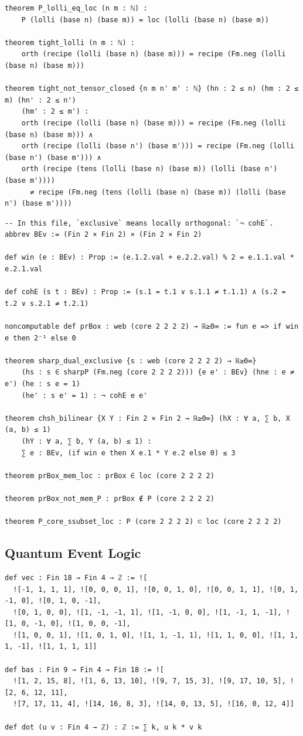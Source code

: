 \begin{lstlisting}
theorem P_lolli_eq_loc (n m : ℕ) :
    P (lolli (base n) (base m)) = loc (lolli (base n) (base m))

theorem tight_lolli (n m : ℕ) :
    orth (recipe (lolli (base n) (base m))) = recipe (Fm.neg (lolli (base n) (base m)))

theorem tight_not_tensor_closed {n m n' m' : ℕ} (hn : 2 ≤ n) (hm : 2 ≤ m) (hn' : 2 ≤ n')
    (hm' : 2 ≤ m') :
    orth (recipe (lolli (base n) (base m))) = recipe (Fm.neg (lolli (base n) (base m))) ∧
    orth (recipe (lolli (base n') (base m'))) = recipe (Fm.neg (lolli (base n') (base m'))) ∧
    orth (recipe (tens (lolli (base n) (base m)) (lolli (base n') (base m'))))
      ≠ recipe (Fm.neg (tens (lolli (base n) (base m)) (lolli (base n') (base m'))))
\end{lstlisting}

\begin{lstlisting}
-- In this file, `exclusive` means locally orthogonal: `¬ cohE`.
abbrev BEv := (Fin 2 × Fin 2) × (Fin 2 × Fin 2)

def win (e : BEv) : Prop := (e.1.2.val + e.2.2.val) % 2 = e.1.1.val * e.2.1.val

def cohE (s t : BEv) : Prop := (s.1 = t.1 ∨ s.1.1 ≠ t.1.1) ∧ (s.2 = t.2 ∨ s.2.1 ≠ t.2.1)

noncomputable def prBox : web (core 2 2 2 2) → ℝ≥0∞ := fun e => if win e then 2⁻¹ else 0

theorem sharp_dual_exclusive {s : web (core 2 2 2 2) → ℝ≥0∞}
    (hs : s ∈ sharpP (Fm.neg (core 2 2 2 2))) {e e' : BEv} (hne : e ≠ e') (he : s e = 1)
    (he' : s e' = 1) : ¬ cohE e e'

theorem chsh_bilinear {X Y : Fin 2 × Fin 2 → ℝ≥0∞} (hX : ∀ a, ∑ b, X (a, b) ≤ 1)
    (hY : ∀ a, ∑ b, Y (a, b) ≤ 1) :
    ∑ e : BEv, (if win e then X e.1 * Y e.2 else 0) ≤ 3

theorem prBox_mem_loc : prBox ∈ loc (core 2 2 2 2)

theorem prBox_not_mem_P : prBox ∉ P (core 2 2 2 2)

theorem P_core_ssubset_loc : P (core 2 2 2 2) ⊂ loc (core 2 2 2 2)
\end{lstlisting}

\subsection{Quantum Event Logic}

\begin{lstlisting}
def vec : Fin 18 → Fin 4 → ℤ := ![
  ![-1, 1, 1, 1], ![0, 0, 0, 1], ![0, 0, 1, 0], ![0, 0, 1, 1], ![0, 1, -1, 0], ![0, 1, 0, -1],
  ![0, 1, 0, 0], ![1, -1, -1, 1], ![1, -1, 0, 0], ![1, -1, 1, -1], ![1, 0, -1, 0], ![1, 0, 0, -1],
  ![1, 0, 0, 1], ![1, 0, 1, 0], ![1, 1, -1, 1], ![1, 1, 0, 0], ![1, 1, 1, -1], ![1, 1, 1, 1]]

def bas : Fin 9 → Fin 4 → Fin 18 := ![
  ![1, 2, 15, 8], ![1, 6, 13, 10], ![9, 7, 15, 3], ![9, 17, 10, 5], ![2, 6, 12, 11],
  ![7, 17, 11, 4], ![14, 16, 8, 3], ![14, 0, 13, 5], ![16, 0, 12, 4]]

def dot (u v : Fin 4 → ℤ) : ℤ := ∑ k, u k * v k
\end{lstlisting}

